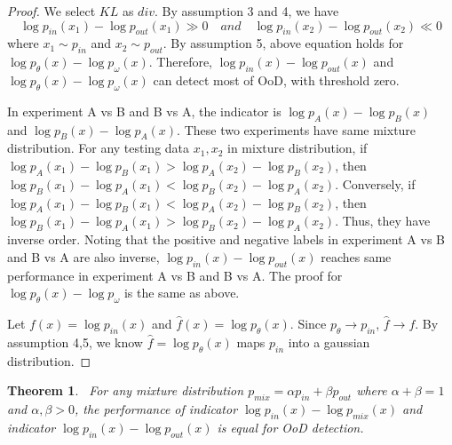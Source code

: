 \documentclass[a3paper]{article}
\newtheorem{theorem}{Theorem}
\newtheorem*{proof}{\it{Proof.}\rm}
\newcommand{\pin}{p_{in}}
\newcommand{\pout}{p_{out}}
\newcommand{\pmix}{p_{mix}}
\begin{document}
\begin{proof}\rm
	We select $KL$ as $div$. By assumption 3 and 4, we have
	\begin{equation*}
		\log \pin(x_1) - \log \pout(x_1) \gg 0 \quad and \quad \log \pin(x_2) - \log \pout(x_2) \ll 0 
	\end{equation*}
	where $x_1 \sim \pin$ and $x_2 \sim \pout$. By assumption 5, above equation holds for $\log p_\theta(x) - \log p_\omega(x)$. Therefore, $\log \pin(x) - \log \pout(x)$ and $\log p_\theta(x) - \log p_\omega(x)$ can detect most of OoD, with threshold zero. 
	
	In experiment A vs B and B vs A, the indicator is $\log p_A(x) - \log p_B(x)$ and $\log p_B(x) - \log p_A(x)$. These two experiments have same mixture distribution. For any testing data $x_1, x_2$ in mixture distribution, if $\log p_A(x_1) - \log p_B(x_1) > \log p_A(x_2) - \log p_B(x_2)$, then $\log p_B(x_1) - \log p_A(x_1) < \log p_B(x_2) - \log p_A(x_2)$. Conversely, if $\log p_A(x_1) - \log p_B(x_1) < \log p_A(x_2) - \log p_B(x_2)$, then $\log p_B(x_1) - \log p_A(x_1) > \log p_B(x_2) - \log p_A(x_2)$. Thus, they have inverse order. 
	Noting that the positive and negative labels in experiment A vs B and B vs A are also inverse, $\log \pin(x) - \log \pout(x)$ reaches same performance in experiment A vs B and B vs A. The proof for $\log p_\theta(x) - \log p_\omega$ is the same as above. 
	
	Let $f(x) = \log \pin(x)$ and $\hat{f}(x) = \log p_\theta(x)$. Since $p_\theta \rightarrow \pin$, $\hat{f} \rightarrow f$. By assumption 4,5, we know $\hat{f} = \log p_\theta(x)$ maps $\pin$ into a gaussian distribution. 
\end{proof}

\begin{theorem}~\label{thm2}
	For any mixture distribution $\pmix = \alpha \pin + \beta \pout$ where $\alpha + \beta = 1$ and $\alpha, \beta > 0$, the performance of indicator $\log \pin(x) - \log \pmix(x)$ and indicator $\log \pin(x) - \log \pout(x)$ is equal for OoD detection. 
\end{theorem}
\end{document}
